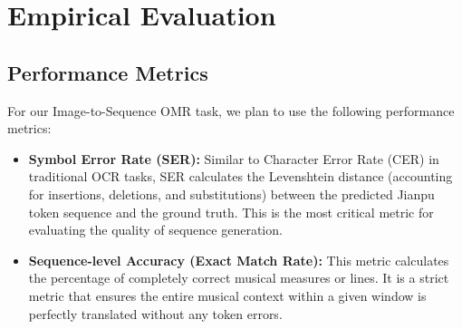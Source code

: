 \section{Empirical Evaluation}
\label{section:evaluation}

\subsection{Performance Metrics}
For our Image-to-Sequence OMR task, we plan to use the following performance metrics:
\begin{itemize}
    \item \textbf{Symbol Error Rate (SER):} Similar to Character Error Rate (CER) in traditional OCR tasks, SER calculates the Levenshtein distance (accounting for insertions, deletions, and substitutions) between the predicted Jianpu token sequence and the ground truth. This is the most critical metric for evaluating the quality of sequence generation.
    \item \textbf{Sequence-level Accuracy (Exact Match Rate):} This metric calculates the percentage of completely correct musical measures or lines. It is a strict metric that ensures the entire musical context within a given window is perfectly translated without any token errors.
\end{itemize}

